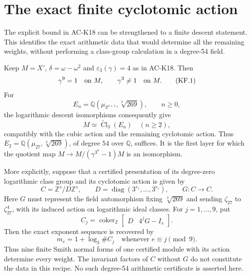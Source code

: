\section{The exact finite cyclotomic action}
\label{sec:cubic-finite-action}

The explicit bound in AC-K18 can be strengthened to a finite
descent statement.  This identifies the exact arithmetic data
that would determine all the remaining weights, without
performing a class-group calculation in a degree-54 field.

\begin{theorem}
\label{AC-K20}
Keep $M=X'$, $\delta=\omega-\omega^2$ and
$\varepsilon_3(\gamma)=4$ as in AC-K18.  Then
\[
                    \gamma^9=1\quad\hbox{on }M,
       \qquad \gamma^3\ne1\quad\hbox{on }M.          \tag{KF.1}
\]
For
\[
 E_n=\mathbb Q(\mu_{3^{n+1}},\sqrt[3]{269}),
 \qquad n\geq0,
\]
the logarithmic descent isomorphisms consequently give
\[
 M\simeq\widetilde{\operatorname{Cl}}_3(E_n)
                      \quad(n\geq2),                 \tag{KF.2}
\]
compatibly with the cubic action and the remaining cyclotomic
action.  Thus $E_2=\mathbb Q(\mu_{27},\sqrt[3]{269})$, of
degree $54$ over $\mathbb Q$, suffices.  It is the first layer
for which the quotient map
$M\to M/(\gamma^{3^n}-1)M$ is an isomorphism.

More explicitly, suppose that a certified presentation of its
degree-zero logarithmic class group and its cyclotomic action
is given by
\[
 C=\mathbb Z^s/D\mathbb Z^s,
 \qquad D=\operatorname{diag}(3^{r_1},\ldots,3^{r_s}),
 \qquad G:C\longrightarrow C.                         \tag{KF.3}
\]
Here $G$ must represent the field automorphism fixing
$\sqrt[3]{269}$ and sending $\zeta_{27}$ to
$\zeta_{27}^4$, with its induced action on logarithmic ideal
classes.  For $j=1,\ldots,9$, put
\[
 C_j=\operatorname{coker}_{\mathbb Z}
       \begin{bmatrix}D&4^jG-I_s\end{bmatrix}.
                                                               \tag{KF.4}
\]
Then the exact exponent sequence is recovered by
\[
       m_e=1+\log_3\#C_j
       \quad\text{whenever }e\equiv j\pmod9.         \tag{KF.5}
\]
Thus nine finite Smith normal forms of one certified module
with its action determine every weight.  The invariant factors
of $C$ without $G$ do not constitute the data in this recipe.
No such degree-54 arithmetic certificate is asserted here.
\end{theorem}
